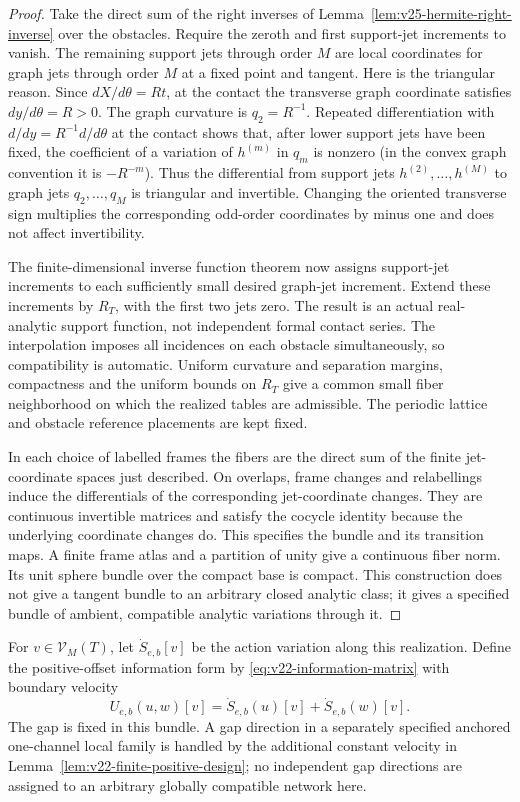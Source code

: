 \begin{proof}
Take the direct sum of the right inverses of
Lemma~\ref{lem:v25-hermite-right-inverse} over the obstacles.  Require the
zeroth and first support-jet increments to vanish.  The remaining support
jets through order \(M\) are local coordinates for graph jets through order
\(M\) at a fixed point and tangent.  Here is the triangular reason.
Since \(dX/d\theta=R t\), at the contact the transverse graph coordinate
satisfies \(dy/d\theta=R>0\).  The graph curvature is \(q_2=R^{-1}\).
Repeated differentiation with \(d/dy=R^{-1}d/d\theta\) at the contact
shows that, after lower support jets have been fixed, the coefficient of a
variation of \(h^{(m)}\) in \(q_m\) is nonzero (in the convex graph
convention it is \(-R^{-m}\)).  Thus the differential from support jets
\(h^{(2)},\ldots,h^{(M)}\) to graph jets \(q_2,\ldots,q_M\) is triangular
and invertible.  Changing the oriented transverse sign multiplies the
corresponding odd-order coordinates by minus one and does not affect
invertibility.

The finite-dimensional inverse function theorem now assigns support-jet
increments to each sufficiently small desired graph-jet increment.  Extend
these increments by \(R_T\), with the first two jets zero.  The result is
an actual real-analytic support function, not independent formal contact
series.  The interpolation imposes all incidences on each obstacle
simultaneously, so compatibility is automatic.  Uniform curvature and
separation margins, compactness and the uniform bounds on \(R_T\) give a
common small fiber neighborhood on which the realized tables are admissible.
The periodic lattice and obstacle reference placements are kept fixed.

In each choice of labelled frames the fibers are the direct sum of the
finite jet-coordinate spaces just described.  On overlaps, frame changes
and relabellings induce the differentials of the corresponding jet-coordinate
changes.  They are continuous invertible matrices and satisfy the cocycle
identity because the underlying coordinate changes do.  This specifies the
bundle and its transition maps.  A finite frame atlas and a partition of
unity give a continuous fiber norm.  Its unit sphere bundle over the compact
base is compact.  This construction does not give a tangent bundle to an
arbitrary closed analytic class; it gives a specified bundle of ambient,
compatible analytic variations through it.
\end{proof}

For \(v\in\mathcal V_M(T)\), let \(\dot S_{e,b}[v]\) be the action
variation along this realization.  Define the positive-offset information
form by \eqref{eq:v22-information-matrix} with boundary velocity
\[
                 U_{e,b}(u,w)[v]=\dot S_{e,b}(u)[v]
                                      +\dot S_{e,b}(w)[v].
\]
The gap is fixed in this bundle.  A gap direction in a separately specified
anchored one-channel local family is handled by the additional constant
velocity in Lemma~\ref{lem:v22-finite-positive-design}; no independent gap
directions are assigned to an arbitrary globally compatible network here.

